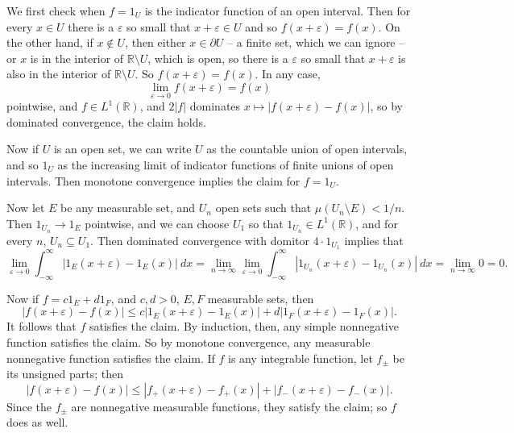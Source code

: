 \documentclass[10pt]{article}
\newcommand{\RR}{\mathbb{R}}
\theoremstyle{definition}
\begin{document}
We first check when $f = 1_U$ is the indicator function of an open interval.
Then for every $x \in U$ there is a $\varepsilon$ so small that $x + \varepsilon \in U$ and so $f(x + \varepsilon) = f(x)$.
On the other hand, if $x \notin U$, then either $x \in \partial U$ -- a finite set, which we can ignore -- or $x$ is in the interior of $\RR \setminus U$, which is open, so there is a $\varepsilon$ so small that $x + \varepsilon$ is also in the interior of $\RR \setminus U$.
So $f(x + \varepsilon) = f(x)$.
In any case,
$$\lim_{\varepsilon \to 0} f(x + \varepsilon) = f(x)$$
pointwise, and $f \in L^1(\RR)$, and $2|f|$ dominates $x \mapsto |f(x + \varepsilon) - f(x)|$, so by dominated convergence, the claim holds.

Now if $U$ is an open set, we can write $U$ as the countable union of open intervals, and so $1_U$ as the increasing limit of indicator functions of finite unions of open intervals. Then monotone convergence implies the claim for $f = 1_U$.

Now let $E$ be any measurable set, and $U_n$ open sets such that $\mu(U_n \setminus E) < 1/n$.
Then $1_{U_n} \to 1_E$ pointwise, and we can choose $U_1$ so that $1_{U_n} \in L^1(\RR)$, and for every $n$, $U_n \subseteq U_1$.
Then dominated convergence with domitor $4\cdot 1_{U_1}$ implies that
$$\lim_{\varepsilon \to 0} \int_{-\infty}^\infty |1_E(x + \varepsilon) - 1_E(x)|~dx = \lim_{n \to \infty} \lim_{\varepsilon \to 0} \int_{-\infty}^\infty |1_{U_n}(x + \varepsilon) - 1_{U_n}(x)|~dx = \lim_{n \to \infty} 0 = 0.$$

Now if $f = c1_E + d1_F$, and $c,d > 0$, $E,F$ measurable sets, then
$$|f(x + \varepsilon) - f(x)| \leq c |1_E(x + \varepsilon) - 1_E(x)| + d|1_F(x + \varepsilon) - 1_F(x)|.$$
It follows that $f$ satisfies the claim.
By induction, then, any simple nonnegative function satisfies the claim.
So by monotone convergence, any measurable nonnegative function satisfies the claim.
If $f$ is any integrable function, let $f_\pm$ be its unsigned parts; then
$$|f(x + \varepsilon) - f(x)| \leq |f_+(x + \varepsilon) - f_+(x)| + |f_-(x + \varepsilon) - f_-(x)|.$$
Since the $f_\pm$ are nonnegative measurable functions, they satisfy the claim; so $f$ does as well.
\end{document}
